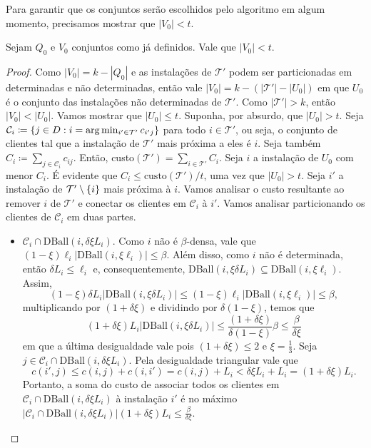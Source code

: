     Para garantir que os conjuntos serão escolhidos pelo algoritmo em algum momento, precisamos mostrar que $|V_0| < t$.
    \begin{lemma}
        Sejam $Q_0$ e $V_0$ conjuntos como já definidos. Vale que ${|V_0| < t}$.
    \end{lemma}
    \begin{proof}
    Como $|V_0| = k - |Q_0|$ e as instalações de $\mathcal{T}'$ podem ser particionadas em determinadas e não determinadas, então vale ${|V_0| = k - (|\mathcal{T}'| - |U_0|)}$ em que $U_0$ é o conjunto das instalações não determinadas de $\mathcal{T}'$. Como $|\mathcal{T}'| > k$, então $|V_0| < |U_0|$. Vamos mostrar que $|U_0| \leq t$. Suponha, por absurdo, que $|U_0| > t$. Seja $\mathcal{C}_i \coloneqq \{j \in D : i = \arg\min_{i' \in \mathcal{T}'} c_{i'j}\}$ para todo $i \in \mathcal{T}'$, ou seja, o conjunto de clientes tal que a instalação de $\mathcal{T}'$ mais próxima a eles é $i$. Seja também $C_i \coloneqq \sum_{j \in \mathcal{C}_i} c_{ij}$. Então, custo$(\mathcal{T'}) =\sum_{i \in \mathcal{T}'} C_i$. Seja $i$ a instalação de $U_0$ com menor $C_i$. É evidente que $C_i \leq \text{custo}(\mathcal{T}')/t$, uma vez que $|U_0| > t$. Seja $i'$ a instalação de $\mathcal{T'}\setminus\{i\}$ mais próxima à $i$. Vamos analisar o custo resultante ao remover $i$ de $\mathcal{T}'$ e conectar os clientes em $\mathcal{C}_i$ à $i'$. Vamos analisar particionando os clientes de $\mathcal{C}_i$ em duas partes.
    \begin{itemize}
        \item $\mathcal{C}_i \cap \text{DBall}(i,\delta\xi L_i)$. Como $i$ não é $\beta$-densa, vale que ${(1-\xi) \ell_i |\text{DBall}(i,\xi\ell_i)| \leq \beta}$. Além disso, como $i$ não é determinada, então $\delta L_i \leq \ell_i$ e, consequentemente, DBall$(i, \xi\delta L_i) \subseteq \text{DBall}(i,\xi\ell_i)$. Assim,
        \[(1 - \xi) \delta L_i |\text{DBall}(i,\xi\delta L_i)| \leq (1-\xi)\ell_i |\text{DBall}(i,\xi\ell_i)| \leq \beta,\]
        multiplicando por $(1 + \delta\xi)$ e dividindo por $\delta(1 - \xi)$, temos que
        \[(1 + \delta\xi) L_i |\text{DBall}(i,\xi\delta L_i)| \leq \frac{(1 + \delta\xi)}{\delta(1 - \xi)} \beta \leq \frac{\beta}{\delta\xi}\]
        em que a última desigualdade vale pois $(1 + \delta\xi) \leq 2$ e $\xi = \frac{1}{3}$. Seja ${j \in \mathcal{C}_i \cap \text{DBall}(i, \delta \xi L_i)}$. Pela desigualdade triangular vale que \[c(i',j) \leq c(i,j) + c(i,i') = c(i,j) + L_i < \delta\xi L_i + L_i = (1 + \delta\xi) L_i.\] Portanto, a soma do custo de associar todos os clientes em $\mathcal{C}_i \cap \text{DBall}(i, \delta \xi L_i)$ à instalação $i'$ é no máximo $ |\mathcal{C}_i \cap \text{DBall}(i, \delta \xi L_i)| ( 1 + \delta\xi) L_i \leq \frac{\beta}{\delta\xi}$.

\end{itemize}
\end{proof}
